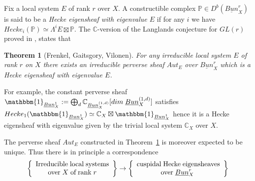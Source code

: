 \documentclass[a4paper,10pt]{amsart}
\def\C{\mathbb{C}}
\newtheorem{theo}{\bf{Theorem}}[section]
\numberwithin{equation}{section}
\begin{document}
\vspace{.1in}

Fix a local system $E$ of rank $r$ over $X$. A constructible complex $\mathbb{P} \in D^b(\underline{Bun}^r_X)$ is said to be a \textit{Hecke eigensheaf with eigenvalue $E$} if for any $i$ we have $Hecke_i(\mathbb{P}) \simeq \Lambda^iE \boxtimes \mathbb{P}$. The $\C$-version of the Langlands conjecture for $GL(r)$ proved in \cite{FGV}, \cite{G} states that

\vspace{.1in}

\begin{theo}[Frenkel, Gaitsgory, Vilonen]\label{T:geolang} For any irreducible local system $E$ of rank $r$ on $X$ there exists an irreducible perverse sheaf $Aut_E$ over $\underline{Bun}^r_X$ which is a Hecke eigensheaf with eigenvalue $E$.
\end{theo}

For example, the constant perverse sheaf $\mathbbm{1}_{\underline{Bun}^1_X}:=\bigoplus_{d} \C_{\underline{Bun}^{(1,d)}_X}[dim\; \underline{Bun}^{(1,d)}_X]$ satisfies $Hecke_1(\mathbbm{1}_{\underline{Bun}^1_X}) \simeq \C_X \boxtimes \mathbbm{1}_{\underline{Bun}^1_X}$ hence it is a Hecke eigensheaf with eigenvalue given by the trivial local system $\C_X$ over $X$.

\vspace{.1in}

The perverse sheaf $Aut_E$ constructed in Theorem~\ref{T:geolang} is moreover expected to be unique. Thus there is in principle a correspondence
\begin{equation}\label{E:corresp1}
\left\{ \begin{array}{c} \text{Irreducible\;local\;systems}\\\text{over\;}X\;\text{of\;rank}\;r\end{array}\right\} \rightarrow \left\{ \begin{array}{c} \text{cuspidal\;Hecke\;eigensheaves}\\\text{over\;}\underline{Bun}^r_X\;\end{array}\right\} 
\end{equation}
\end{document}
